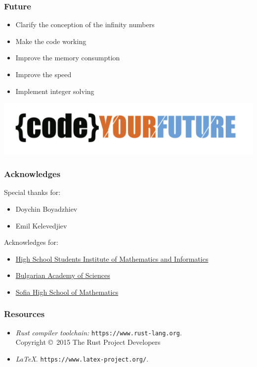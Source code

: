 \documentclass[12pt]{beamer}
\begin{document}
	\begin{frame}
		\frametitle{Future}
		\begin{itemize}
			\item Clarify the conception of the infinity numbers
			\item Make the code working
			\item Improve the memory consumption
			\item Improve the speed
			\item Implement integer solving
		\end{itemize}
		\begin{center}
			\includegraphics[scale=0.15]{CodeYourFuture}
		\end{center}
		\vspace{-1cm}
	\end{frame}

	\begin{frame}
		\frametitle{Acknowledges}
		Special thanks for:
		\begin{itemize}
			\item Doychin Boyadzhiev
			\item Emil Kelevedjiev
		\end{itemize}
		\vspace{0.5cm}
		Acknowledges for:
		\begin{itemize}
			\item \href{http://www.math.bas.bg/omi/hssimi/}{High School Students Institute of Mathematics and Informatics}
			\item \href{http://www.math.bas.bg/}{Bulgarian Academy of Sciences}
			\item \href{http://www.smg.bg}{Sofia High School of Mathematics}
		\end{itemize}
	\end{frame}
	
	\begin{frame}
	\frametitle{Resources}
		\begin{itemize}
			\item%
			{\itshape Rust compiler toolchain:}
			\texttt{https://www.rust-lang.org}. \\
            Copyright \copyright\ 2015 The Rust Project Developers
			\item%
			{\itshape \LaTeX}.
			\texttt{https://www.latex-project.org/}.
		\end{itemize}
	\end{frame}
	
\end{document}
